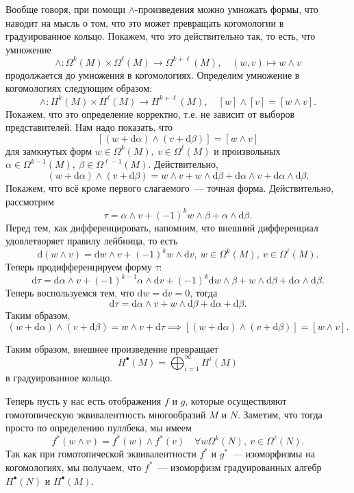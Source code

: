  		  Вообще говоря, при помощи $\wedge$-произведения можно умножать формы, что наводит на мысль о том, что это может превращать когомологии в градуированное кольцо. Покажем, что это действительно так, то есть, что умножение 
 		  \[
 		  	\wedge\colon \Omega^k(M) \times \Omega^{\ell}(M) \to \Omega^{k + \ell}(M), \quad (w, v) \mapsto w \wedge v
 		  \]
 		  продолжается до умножения в когомологиях. Определим умножение в когомологиях следующим образом: 
 		  \[
 		  	\wedge \colon H^k(M) \times H^{\ell}(M) \to H^{k + \ell}(M), \quad [w] \wedge [v] = [w \wedge v]. 
 		  \]
 		  Покажем, что это определение корректно, т.е. не зависит от выборов представителей. Нам надо показать, что 
 		  \[
 		  	[(w + \mathrm{d}\alpha) \wedge (v + \mathrm{d}\beta)] = [w \wedge v]
 		  \]
 		  для замкнутых форм $w \in \Omega^k(M), \ v \in \Omega^{\ell}(M)$ и произвольных $\alpha \in \Omega^{k - 1}(M), \ \beta \in \Omega^{\ell - 1}(M)$. Действительно, 
 		  \[
 		  	(w + \mathrm{d}\alpha) \wedge (v + \mathrm{d}\beta) = w \wedge v + w \wedge \mathrm{d}\beta + \mathrm{d}\alpha \wedge v + \mathrm{d}\alpha \wedge \mathrm{d}\beta.
 		  \]
 		  Покажем, что всё кроме первого слагаемого~--- точная форма. Действительно, рассмотрим 
 		  \[
 		  	\tau = \alpha \wedge v + (-1)^{k} w \wedge \beta + \alpha \wedge \mathrm{d}\beta.
 		  \]
 		  Перед тем, как дифференцировать, напомним, что внешний дифференциал удовлетворяет правилу лейбница, то есть 
 		  \[
 		  	\mathrm{d}(w \wedge v) = \mathrm{d}w \wedge v + (-1)^k w \wedge \mathrm{d}v, \ w \in \Omega^k(M), \ v \in \Omega^{\ell}(M).
 		  \]
 		  Теперь продифференцируем форму $\tau$: 
 		  \[
 		  	\mathrm{d}\tau = \mathrm{d}\alpha \wedge v + (-1)^{k - 1}\alpha \wedge \mathrm{d}v + (-1)^k \mathrm{d}w \wedge \beta + w \wedge \mathrm{d}\beta + \mathrm{d}\alpha \wedge \mathrm{d}\beta.
 		  \]
 		  Теперь воспользуемся тем, что $\mathrm{d}w = \mathrm{d}v = 0$, тогда 
 		  \[
 		  	  \mathrm{d}\tau = \mathrm{d}\alpha \wedge v + w \wedge \mathrm{d}\beta + \mathrm{d}\alpha + \mathrm{d}\beta.
 		  \]
 		  Таким образом,  
 		  \[
 		  		(w + \mathrm{d}\alpha) \wedge (v + \mathrm{d}\beta) = w \wedge v + \mathrm{d}\tau \implies [(w + \mathrm{d}\alpha) \wedge (v + \mathrm{d}\beta)] = [w \wedge v]. 
 		  \]

 		  
 		  Таким образом, внешнее произведение превращает 
 		  \[
 		  	H^{\bullet}(M) = \bigoplus_{i = 1}^{\infty} H^{i}(M)
 		  \]
 		  в градуированное кольцо. 

        Теперь пусть у нас есть отображения $f$ и $g$, которые осуществляют гомотопическую эквивалентность многообразий $M$ и $N$. Заметим, что тогда просто по определению пуллбека, мы имеем 
        \[ 
            f^{*}(w \wedge v) = f^*(w) \wedge f^*(v) \quad \forall w \Omega^k(N), \ v \in \Omega^{\ell}(N).
        \]
        Так как при гомотопической эквивалентности $f^*$ и $g^*$~--- изоморфизмы на когомологиях, мы получаем, что $f^*$~--- изоморфизм градуированных алгебр $H^{\bullet}(N)$ и $H^{\bullet}(M)$.
    